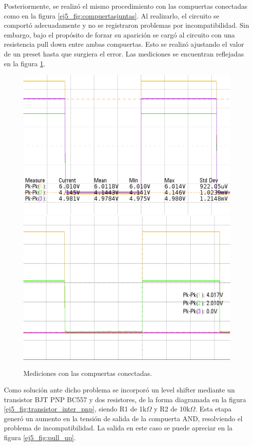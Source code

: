 \noindent
Posteriormente, se realiz\'o el mismo procedimiento con las compuertas conectadas como en la figura \ref{ej5_fig:compuertasjuntas}. Al realizarlo, el circuito se comport\'o adecuadamente y no se registraron problemas por incompatibilidad. Sin embargo, bajo el prop\'osito de forzar su aparici\'on se carg\'o al circuito con una resistencia pull down entre ambas compuertas. Esto se realiz\'o ajustando el valor de un preset hasta que surgiera el error. Las mediciones se encuentran reflejadas en la figura \ref{ej5_fig:incompatibilidad}.

\begin{figure}[H]
    \centering
    \includegraphics[width=.475\textwidth]{figs/ej5/andorsinres.png}\hfill
    \includegraphics[width=.475\textwidth]{figs/ej5/pull_down.png}
    \caption{Mediciones con las compuertas conectadas.}
     \label{ej5_fig:incompatibilidad}
   
\end{figure}

\noindent
Como soluci\'on ante dicho problema se incorpor\'o un level shifter mediante un transistor BJT PNP BC557 y dos resistores, de la forma diagramada en la figura \ref{ej5_fig:transistor_inter_pnp}, siendo R1 de 1k$\Omega$ y R2 de 10k$\Omega$. Esta etapa gener\'o un aumento en la tensi\'on de salida de la compuerta AND, resolviendo el problema de incompatibilidad. La salida en este caso se puede apreciar en la figura \ref{ej5_fig:pull_up}.

